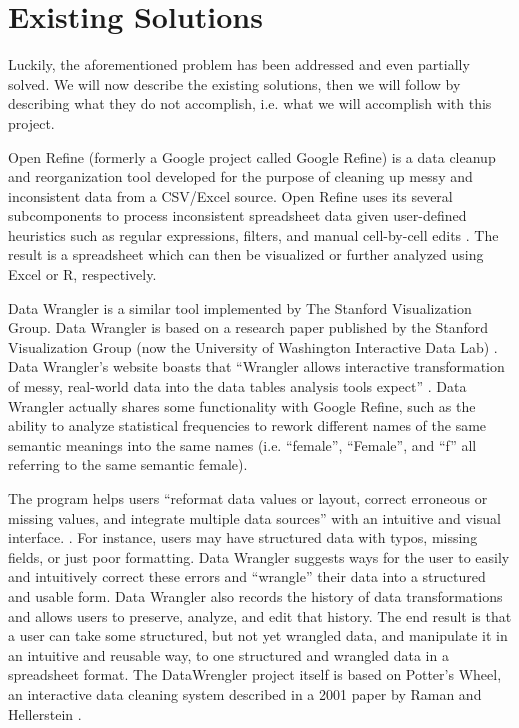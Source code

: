 \documentclass{../sty/acm_proc_article-sp}
\begin{document}
\section{Existing Solutions}
Luckily, the aforementioned problem has been addressed and even partially solved. We will now describe the existing solutions, then we will follow by describing what they do not accomplish, i.e. what we will accomplish with this project.

Open Refine (formerly a Google project called Google Refine) is a data cleanup and reorganization tool developed for the purpose of cleaning up messy and inconsistent data from a CSV/Excel source. Open Refine uses its several subcomponents to process inconsistent spreadsheet data given user-defined heuristics such as regular expressions, filters, and manual cell-by-cell edits \cite{Refine}. The result is a spreadsheet which can then be visualized or further analyzed using Excel or R, respectively.

Data Wrangler is a similar tool implemented by The Stanford Visualization Group. Data Wrangler is based on a research paper published by the Stanford Visualization Group (now the University of Washington Interactive Data Lab) \cite{2011-wrangler}. Data Wrangler's website boasts that ``Wrangler allows interactive transformation of messy, real-world data into the data tables analysis tools expect'' \cite{wrangler-web}. Data Wrangler actually shares some functionality with Google Refine, such as the ability to analyze statistical frequencies to rework different names of the same semantic meanings into the same names (i.e. ``female'', ``Female'', and ``f'' all referring to the same semantic female).

The program helps users ``reformat data values or layout, correct erroneous or missing values, and integrate multiple data sources'' with an intuitive and visual interface. \cite{2011-wrangler}. For instance, users may have structured data with typos, missing fields, or just poor formatting. Data Wrangler suggests ways for the user to easily and intuitively correct these errors and ``wrangle'' their data into a structured and usable form. Data Wrangler also records the history of data transformations and allows users to preserve, analyze, and edit that history. The end result is that a user can take some structured, but not yet wrangled data, and manipulate it in an intuitive and reusable way, to one structured and wrangled data in a spreadsheet format.
The DataWrengler project itself is based on Potter's Wheel, an interactive data cleaning system described in a 2001 paper by Raman and Hellerstein \cite{raman2001potter}.
\end{document}
